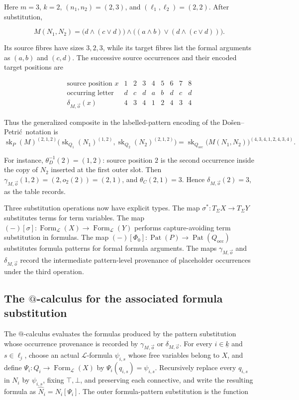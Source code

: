 \documentclass[11pt]{article}
\makeatletter
\newcommand{\atsign}{\mathord{@}}
\newcommand{\finord}[1]{\underline{#1}}
\newcommand{\DP}{Do\v{s}en--Petri\'{c}}
\makeatother
\begin{document}
Here \(m=3\), \(k=2\), \((n_1,n_2)=(2,3)\), and
\((\ell_1,\ell_2)=(2,2)\). After substitution,

\[
M(N_1,N_2)
=\bigl(d\wedge(c\vee d)\bigr)
 \wedge
 \bigl((a\wedge b)\vee(d\wedge(c\vee d))\bigr).
\]

Its source fibres have sizes \(3,2,3\), while its target fibres list the
formal arguments as \((a,b)\) and \((c,d)\). The successive source
occurrences and their encoded target positions are

\[
\begin{array}{c|ccc|cc|ccc}
\text{source position }x&1&2&3&4&5&6&7&8\\ \hline
\text{occurring letter}&d&c&d&a&b&d&c&d\\
\delta_{M,\vec o}(x)&4&3&4&1&2&4&3&4
\end{array}
\]

Thus the generalized composite in the labelled-pattern encoding of the
\DP\ notation is
\[
\operatorname{sk}_P(M)^{(2,1,2)}
\bigl(\operatorname{sk}_{Q_1}(N_1)^{(1,2)},
      \operatorname{sk}_{Q_2}(N_2)^{(2,1,2)}\bigr)
=\operatorname{sk}_{Q_{\mathrm{occ}}}
 \bigl(M(N_1,N_2)\bigr)^{(4,3,4,1,2,4,3,4)}.
\]

For instance, \(\theta_D^{-1}(2)=(1,2)\): source position \(2\) is the
second occurrence inside the copy of \(N_2\) inserted at the first outer
slot. Then
\(\gamma_{M,\vec o}(1,2)=(2,o_2(2))=(2,1)\), and
\(\theta_C(2,1)=3\). Hence \(\delta_{M,\vec o}(2)=3\), as the table records.

Three substitution operations now have explicit types.
The map \(\sigma^*:T_\Sigma X\to T_\Sigma Y\) substitutes terms for term
variables. The map
\((-)[\sigma]:\operatorname{Form}_{\mathcal L}(X)\to
\operatorname{Form}_{\mathcal L}(Y)\) performs capture-avoiding term
substitution in formulas. The map
\((-)[\Phi_0]:\operatorname{Pat}(P)\to
\operatorname{Pat}(Q_{\mathrm{occ}})\) substitutes
formula patterns for formal formula arguments. The maps
\(\gamma_{M,\vec o}\) and \(\delta_{M,\vec o}\) record the intermediate
pattern-level provenance of placeholder occurrences under the third operation.

\subsection{The \texorpdfstring{$\atsign$}{@}-calculus for the associated
formula substitution}

The \(\atsign\)-calculus evaluates the formulas produced by the pattern
substitution whose occurrence provenance is recorded by
\(\gamma_{M,\vec o}\) or \(\delta_{M,\vec o}\).
For every
\(i\in\finord k\) and \(s\in\finord{\ell_i}\), choose an actual
\(\mathcal L\)-formula \(\psi_{i,s}\) whose free variables belong to \(X\),
and define
\(\Psi_i:Q_i\to
\operatorname{Form}_{\mathcal L}(X)\) by
\(\Psi_i(q_{i,s})=\psi_{i,s}\). Recursively replace every
\(q_{i,s}\) in \(N_i\) by \(\psi_{i,s}\), fixing \(\top,\bot\), and
preserving each connective, and
write the resulting formula as \(\widehat N_i=N_i[\Psi_i]\). The outer
formula-pattern substitution is the function
\end{document}

